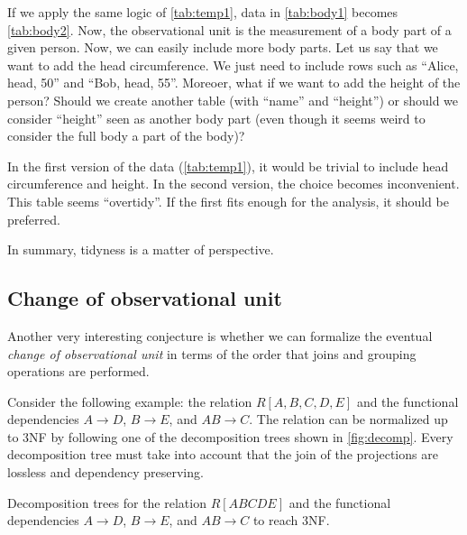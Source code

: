 If we apply the same logic of \cref{tab:temp1}, data in \cref{tab:body1} becomes
\cref{tab:body2}.  Now, the observational unit is the measurement of a body part of a
given person.  Now, we can easily include more body parts.  Let us say that we want to add
the head circumference.  We just need to include rows such as ``Alice, head, 50'' and
``Bob, head, 55''.  Moreoer, what if we want to add the height of the person? Should we
create another table (with ``name'' and ``height'') or should we consider ``height'' seen
as another body part (even though it seems weird to consider the full body a part of the
body)?

In the first version of the data (\cref{tab:temp1}), it would be trivial to include head
circumference and height.  In the second version, the choice becomes inconvenient.  This
table seems ``overtidy''.  If the first fits enough for the analysis, it should be
preferred.

In summary, tidyness is a matter of perspective.

\subsection{Change of observational unit}

Another very interesting conjecture is whether we can formalize the eventual \emph{change
of observational unit} in terms of the order that joins and grouping operations are
performed.

Consider the following example: the relation $R[A, B, C, D, E]$ and the functional
dependencies $A \to D$, $B \to E$, and $AB \to C$.  The relation can be normalized up to
3NF by following one of the decomposition trees shown in \cref{fig:decomp}.
Every decomposition tree must take into account that the join of the projections are
lossless and dependency preserving.

\begin{figurebox}[label=fig:decomp]{Decomposition trees for the relation $R[ABCDE]$ and
  the functional dependencies $A \to D$, $B \to E$, and $AB \to C$ to reach 3NF.}
  \centering
\end{figurebox}

